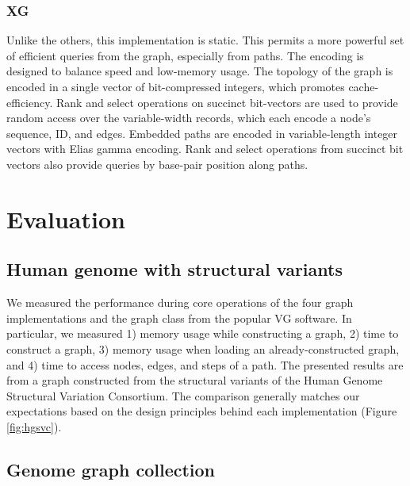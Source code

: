 \documentclass{article}
\begin{document}

\subsubsection{XG}

Unlike the others, this implementation is static.
This permits a more powerful set of efficient queries from the graph, especially from paths.
The encoding is designed to balance speed and low-memory usage.
The topology of the graph is encoded in a single vector of bit-compressed integers, which promotes cache-efficiency.
Rank and select operations on succinct bit-vectors are used to provide random access over the variable-width records, which each encode a node's sequence, ID, and edges.
Embedded paths are encoded in variable-length integer vectors with Elias gamma encoding.
Rank and select operations from succinct bit vectors also provide queries by base-pair position along paths.

\section{Evaluation}

\subsection{Human genome with structural variants}

We measured the performance during core operations of the four graph implementations and the graph class from the popular \textsc{VG} software.
In particular, we measured 1) memory usage while constructing a graph, 2) time to construct a graph, 3) memory usage when loading an already-constructed graph, and 4) time to access nodes, edges, and steps of a path.
The presented results are from a graph constructed from the structural variants of the Human Genome Structural Variation Consortium.
The comparison generally matches our expectations based on the design principles behind each implementation (Figure \ref{fig:hgsvc}).

\subsection{Genome graph collection}
\end{document}
